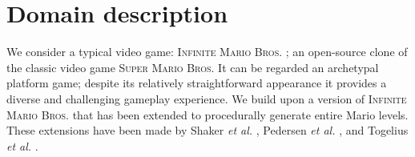 \documentclass[letterpaper]{article}
\begin{document}
%
%



\section{Domain description}\label{domain}

We consider a typical video game: \textsc{Infinite Mario Bros.} \cite{infiniteMario}; an open-source clone of the classic video game \textsc{Super Mario Bros.} It can be regarded an archetypal platform game; despite its relatively straightforward appearance it provides a diverse and challenging gameplay experience. We build upon a version of \textsc{Infinite Mario Bros.} that has been extended to procedurally generate entire Mario levels. These extensions have been made by Shaker \emph{et al.} , Pedersen \emph{et al.} , and Togelius \emph{et al.} .
\end{document}
